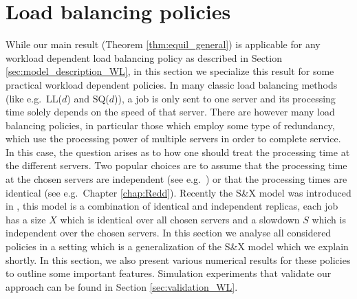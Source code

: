 \documentclass[12pt]{report}
\begin{document}
\section{Load balancing policies}\label{sec:load_balance_policies}

While our main result (Theorem \ref{thm:equil_general}) is applicable for any workload dependent load balancing policy as described in Section \ref{sec:model_description_WL}, in this section we specialize this result for some practical workload dependent policies. In many classic load balancing methods (like e.g.~LL($d$) and SQ($d$)), a job is only sent to one server and its processing time solely depends on the speed of that server. There are however many load balancing policies, in particular those which employ some type of redundancy, which use the processing power of multiple servers in order to complete service. In this case, the question arises as to how one should treat the processing time at the different servers. Two popular choices are to assume that the processing time at the chosen servers are independent (see e.g.~\cite{gardnerOR}) or that the processing times are identical (see e.g.~Chapter \ref{chap:Redd}). Recently the S\&X model was introduced in \cite{gardner1}, this model is a combination of identical and independent replicas, each job has a size $X$ which is identical over all chosen servers and a slowdown $S$ which is independent over the chosen servers. In this section we analyse all considered policies in a setting which is a generalization of the S\&X model which we explain shortly. In this section, we also present various numerical results for these policies to outline some important features. Simulation experiments that validate our approach can be found in Section \ref{sec:validation_WL}.

\end{document}
